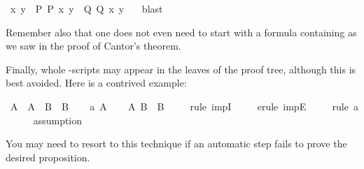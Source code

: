 \begin{isabellebody}
\ x\ y\ \ P{}\ {}P\ x\ y{}\ \ Q{}\ {}Q\ x\ y{}\ \ \isamarkupfalse%
\ blast%
\endisatagproof
{\isafoldproof}%
%
\isadelimproof
%
\endisadelimproof
%
\begin{isamarkuptext}%
Remember also that one does not even need to start with a formula
containing  as we saw in the proof of Cantor's theorem.%
\end{isamarkuptext}%
\isamarkuptrue%
%
\isamarkuptrue%
%
\begin{isamarkuptext}%
Finally, whole -scripts may appear in the leaves of the
proof tree, although this is best avoided.  Here is a contrived example:%
\end{isamarkuptext}%
\isamarkuptrue%
\isamarkupfalse%
\ {}A\ {}\ {}A\ {}\ B{}\ {}\ B{}\isanewline
%
\isadelimproof
%
\endisadelimproof
%
\isatagproof
{}\isamarkupfalse%
\isanewline
\ \ \isamarkupfalse%
\ a{}\ {}A{}\isanewline
\ \ \isamarkupfalse%
\ {}{}A\ {}B{}\ {}\ B{}\isanewline
\ \ \ \ \isamarkupfalse%
{}rule\ impI{}\isanewline
\ \ \ \ \isamarkupfalse%
{}erule\ impE{}\isanewline
\ \ \ \ \isamarkupfalse%
{}rule\ a{}\isanewline
\ \ \ \ \isamarkupfalse%
\ assumption\isanewline
\ \ \ \ \isamarkupfalse%
\isanewline
{}\isamarkupfalse%
%
\endisatagproof
{\isafoldproof}%
%
\isadelimproof
%
\endisadelimproof
%
\begin{isamarkuptext}%
\noindent You may need to resort to this technique if an
automatic step fails to prove the desired proposition.


\end{isamarkuptext}
\end{isabellebody}
